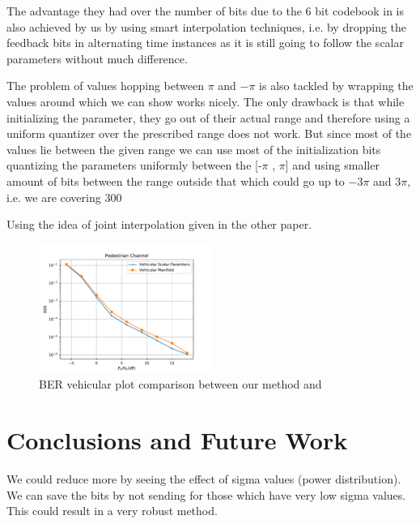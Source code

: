 \documentclass[conference]{IEEEtran}
\begin{document}
The advantage they had over the number of bits due to the 6 bit codebook in \cite{6891198,Gupt1905:Predictive} is also achieved by us by using smart interpolation techniques, i.e. by dropping the feedback bits in alternating time instances as it is still going to follow the scalar parameters without much difference.

The problem of values hopping between $\pi$ and $-\pi$ is also tackled by wrapping the values around which we can show works nicely. The only drawback is that while initializing the parameter, they go out of their actual range and therefore using a uniform quantizer over the prescribed range does not work. But since most of the values lie between the given range we can use most of the initialization bits quantizing the parameters uniformly between the [-$\pi$ , $\pi$] and using smaller amount of bits between the range outside that which could go up to $-3\pi$ and $3\pi$, i.e. we are covering 300%

Using the idea of joint interpolation given in the other paper. 

\begin{figure} 
\includegraphics[width=0.5\textwidth]{images/vehicular_ber.pdf}
\caption{BER vehicular plot comparison between our method and \cite{Gupt1905:Predictive}} 
\label{ber_overview} 
\vspace{-5pt} 
\end{figure} 
\section{Conclusions and Future Work} 
\label{section4} 

We could reduce more by seeing the effect of sigma values (power distribution). We can save the bits by not sending for those which have very low sigma values. This could result in a very robust method. 
\end{document}
